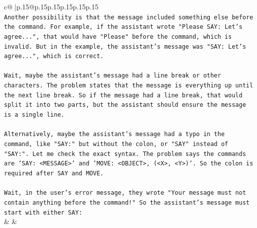 \documentclass{article}
\begin{document}
{\begin{supertabular}{c@{$\;$}|p{.15\linewidth}@{}p{.15\linewidth}p{.15\linewidth}p{.15\linewidth}p{.15\linewidth}p{.15\linewidth}}
{{{\\ 
\texttt{Another possibility is that the message included something else before the command. For example, if the assistant wrote "Please SAY: Let's agree...", that would have "Please" before the command, which is invalid. But in the example, the assistant's message was "SAY: Let's agree...", which is correct.} \\
\\ 
\texttt{Wait, maybe the assistant's message had a line break or other characters. The problem states that the message is everything up until the next line break. So if the message had a line break, that would split it into two parts, but the assistant should ensure the message is a single line.} \\
\\ 
\texttt{Alternatively, maybe the assistant's message had a typo in the command, like "SAY:" but without the colon, or "SAY" instead of "SAY:". Let me check the exact syntax. The problem says the commands are `SAY: <MESSAGE>` and `MOVE: <OBJECT>, (<X>, <Y>)`. So the colon is required after SAY and MOVE.} \\
\\ 
\texttt{Wait, in the user's error message, they wrote "Your message must not contain anything before the command!" So the assistant's message must start with either SAY:} \\
            }
        }
    }
    & & \\ \\


\end{supertabular}}
\end{document}
